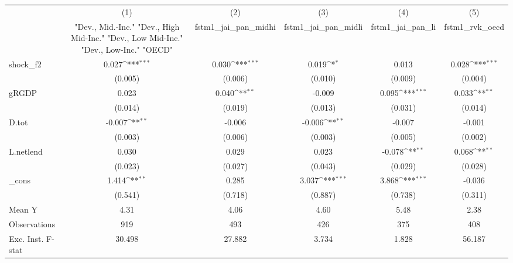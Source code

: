 {
\def\sym#1{\ifmmode^{#1}\else\(^{#1}\)\fi}
\begin{tabular}{l*{5}{c}}
\toprule
            &\multicolumn{1}{c}{(1)}&\multicolumn{1}{c}{(2)}&\multicolumn{1}{c}{(3)}&\multicolumn{1}{c}{(4)}&\multicolumn{1}{c}{(5)}\\
            &\multicolumn{1}{c}{ "Dev., Mid.-Inc." "Dev., High Mid-Inc." "Dev., Low Mid-Inc." "Dev., Low-Inc." "OECD" }&\multicolumn{1}{c}{fstm1\_jai\_pan\_midhi}&\multicolumn{1}{c}{fstm1\_jai\_pan\_midli}&\multicolumn{1}{c}{fstm1\_jai\_pan\_li}&\multicolumn{1}{c}{fstm1\_rvk\_oecd}\\
\midrule
shock\_f2    &       0.027\sym{***}&       0.030\sym{***}&       0.019\sym{*}  &       0.013         &       0.028\sym{***}\\
            &     (0.005)         &     (0.006)         &     (0.010)         &     (0.009)         &     (0.004)         \\
\addlinespace
gRGDP       &       0.023         &       0.040\sym{**} &      -0.009         &       0.095\sym{***}&       0.033\sym{**} \\
            &     (0.014)         &     (0.019)         &     (0.013)         &     (0.031)         &     (0.014)         \\
\addlinespace
D.tot       &      -0.007\sym{**} &      -0.006         &      -0.006\sym{**} &      -0.007         &      -0.001         \\
            &     (0.003)         &     (0.006)         &     (0.003)         &     (0.005)         &     (0.002)         \\
\addlinespace
L.netlend   &       0.030         &       0.029         &       0.023         &      -0.078\sym{**} &       0.068\sym{**} \\
            &     (0.023)         &     (0.027)         &     (0.043)         &     (0.029)         &     (0.028)         \\
\addlinespace
\_cons      &       1.414\sym{**} &       0.285         &       3.037\sym{***}&       3.868\sym{***}&      -0.036         \\
            &     (0.541)         &     (0.718)         &     (0.887)         &     (0.738)         &     (0.311)         \\
\midrule
Mean Y      &        4.31         &        4.06         &        4.60         &        5.48         &        2.38         \\
Observations&         919         &         493         &         426         &         375         &         408         \\
Exc. Inst. F-stat&      30.498         &      27.882         &       3.734         &       1.828         &      56.187         \\
\bottomrule
\end{tabular}
}

